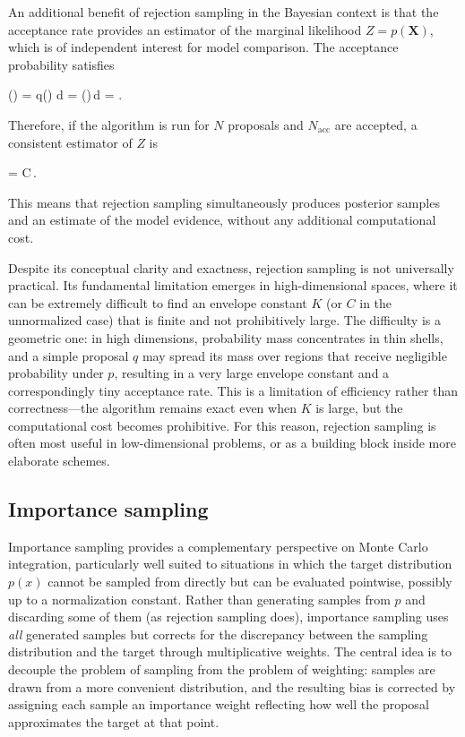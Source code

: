 An additional benefit of rejection sampling in the Bayesian context is that the acceptance rate provides an estimator of the marginal likelihood $Z = p(\mathbf{X})$, which is of independent interest for model comparison. The acceptance probability satisfies
\begin{myequation}
()
= \int q(\theta)\,\,d\theta
= \int \pi(\theta)\,d\theta
= .
\end{myequation}
Therefore, if the algorithm is run for $N$ proposals and $N_{\mathrm{acc}}$ are accepted, a consistent estimator of $Z$ is
\begin{myequation}
 = C\,.
\end{myequation}
This means that rejection sampling simultaneously produces posterior samples and an estimate of the model evidence, without any additional computational cost.

\medskip

Despite its conceptual clarity and exactness, rejection sampling is not universally practical. Its fundamental limitation emerges in high-dimensional spaces, where it can be extremely difficult to find an envelope constant $K$ (or $C$ in the unnormalized case) that is finite and not prohibitively large. The difficulty is a geometric one: in high dimensions, probability mass concentrates in thin shells, and a simple proposal $q$ may spread its mass over regions that receive negligible probability under $p$, resulting in a very large envelope constant and a correspondingly tiny acceptance rate. This is a limitation of efficiency rather than correctness---the algorithm remains exact even when $K$ is large, but the computational cost becomes prohibitive. For this reason, rejection sampling is often most useful in low-dimensional problems, or as a building block inside more elaborate schemes.

\subsection*{Importance sampling}

Importance sampling provides a complementary perspective on Monte Carlo integration, particularly well suited to situations in which the target distribution $p(x)$ cannot be sampled from directly but can be evaluated pointwise, possibly up to a normalization constant. Rather than generating samples from $p$ and discarding some of them (as rejection sampling does), importance sampling uses \emph{all} generated samples but corrects for the discrepancy between the sampling distribution and the target through multiplicative weights. The central idea is to decouple the problem of sampling from the problem of weighting: samples are drawn from a more convenient distribution, and the resulting bias is corrected by assigning each sample an importance weight reflecting how well the proposal approximates the target at that point.

